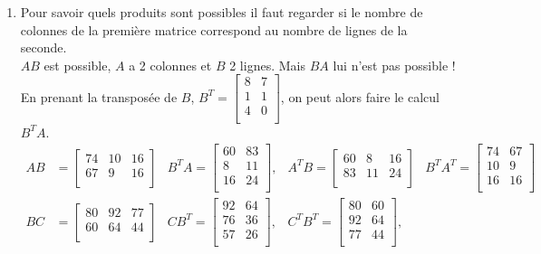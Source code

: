 \documentclass[a4paper]{article}\usepackage[]{graphicx}\usepackage[]{xcolor}
\begin{document}
\begin{enumerate}
    \item Pour savoir quels produits sont possibles il faut regarder si le 
    nombre de colonnes de la première matrice correspond au nombre de lignes 
    de la seconde. \\
    $AB$ est possible, $A$ a 2 colonnes et $B$ 2 lignes. Mais $BA$ lui n'est 
    pas possible !
    En prenant la transposée de $B$, $B^T = \begin{bmatrix} 8 &7 \\1 &1 \\4 &0 \\ \end{bmatrix}$, on peut alors faire 
    le calcul $B^TA$.
    \begin{align*}
        AB &= \begin{bmatrix} 74 &10 &16 \\67 &9 &16 \\ \end{bmatrix} & B^TA = \begin{bmatrix} 60 &83 \\8 &11 \\16 &24 \\ \end{bmatrix}, &  A^TB = \begin{bmatrix} 60 &8 &16 \\83 &11 &24 \\ \end{bmatrix} & B^T A^T = \begin{bmatrix} 74 &67 \\10 &9 \\16 &16 \\ \end{bmatrix}  \\ 
        BC &= \begin{bmatrix} 80 &92 &77 \\60 &64 &44 \\ \end{bmatrix} & CB^T = \begin{bmatrix} 92 &64 \\76 &36 \\57 &26 \\ \end{bmatrix}, & C^TB^T = \begin{bmatrix} 80 &60 \\92 &64 \\77 &44 \\ \end{bmatrix}, &\\
    \end{align*}
\end{enumerate}
\end{document}
